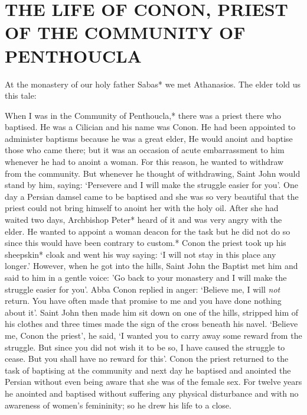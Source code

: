 \chapter{THE LIFE OF CONON, PRIEST OF THE COMMUNITY OF PENTHOUCLA}

At the monastery of our holy father Sabas* we met Athanasios. The
elder told us this tale:

When I was in the Community of Penthoucla,* there was a priest there who baptised.
He was a Cilician and his name was Conon.
He had been appointed to administer baptisms because he was a great elder, He would anoint and baptise those who came there;
but it was an occasion of acute embarrassment to him whenever he had to anoint a woman.
For this reason, he wanted to withdraw from the community.
But whenever he thought of withdrawing, Saint John would stand by him, saying: `Persevere and I will make the struggle easier for you'.
One day a Persian damsel came to be baptised and she was so very beautiful that the priest could not bring himself to anoint her with the holy oil.
After she had waited two days, Archbishop Peter* heard of it and was very angry with the elder.
He wanted to appoint a woman deacon for the task but he did not do
so since this would have been contrary to custom.*
Conon the priest took up his sheepskin* cloak and went his way saying: `I will not stay in this place any longer.'
However, when he got into the hills, Saint John the Baptist met him and said to him in a gentle voice: 'Go back to your monastery and I will make the struggle easier for you'.
Abba Conon replied in anger: `Believe me, I will \textit{not} return.
You have often made that promise to me and you have done nothing about it'.
Saint John then made him sit down on one of the hills, stripped him of his clothes and three times made the sign of the cross beneath his navel.
`Believe me, Conon the priest', he said, `I wanted you to carry away some reward from the struggle.
But since you did not wish it to be so, I have caused the struggle to cease.
But you shall have no reward for this'.
Conon the priest returned to the task of baptising at the community and next day he baptised and anointed the Persian without even being aware that she was of the female sex.
For twelve years he anointed and baptised without suffering any physical disturbance and with no awareness of women's femininity;
so he drew his life to a close.

